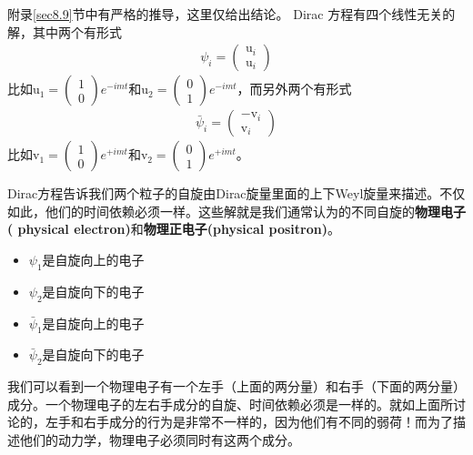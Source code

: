 附录\ref{sec8.9}节中有严格的推导，这里仅给出结论。 Dirac 方程有四个线性无关的解，其中两个有形式
\begin{align}
\psi_i=\left(\begin{matrix}\text{u}_i\\\text{u}_i\end{matrix}\right)
\end{align}
比如$\text{u}_1=\left(\begin{matrix}1\\0\end{matrix}\right)e^{-imt}$和$\text{u}_2=\left(\begin{matrix}0\\1\end{matrix}\right)e^{-imt}$，而另外两个有形式
\begin{align}
\bar{\psi}_i=\left(\begin{matrix}-\text{v}_i\\\text{v}_i\end{matrix}\right)
\end{align}
比如$\text{v}_1=\left(\begin{matrix}1\\0\end{matrix}\right)e^{+imt}$和$\text{v}_2=\left(\begin{matrix}0\\1\end{matrix}\right)e^{+imt}$。

Dirac方程告诉我们两个粒子的自旋由Dirac旋量里面的上下Weyl旋量来描述。不仅如此，他们的时间依赖必须一样。这些解就是我们通常认为的不同自旋的{\bfseries 物理电子( physical electron)}和{\bfseries 物理正电子(physical positron)}。

\begin{itemize}
\item $\psi_1$是自旋向上的电子
\item $\psi_2$是自旋向下的电子
\item $\bar{\psi}_1$是自旋向上的电子
\item $\bar{\psi}_2$是自旋向下的电子
\end{itemize}

我们可以看到一个物理电子有一个左手（上面的两分量）和右手（下面的两分量）成分。一个物理电子的左右手成分的自旋、时间依赖必须是一样的。就如上面所讨论的，左手和右手成分的行为是非常不一样的，因为他们有不同的弱荷！而为了描述他们的动力学，物理电子必须同时有这两个成分。

